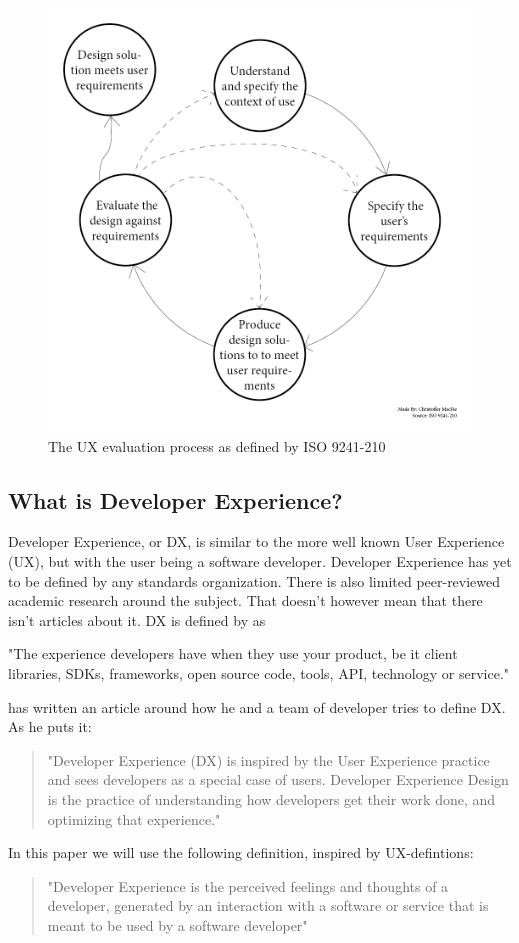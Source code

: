 \documentclass{article}
\begin{document}
\begin{figure}[H]
\centering
\includegraphics[width=\linewidth]{iso9241-210.png}
\caption{The UX evaluation process as defined by ISO 9241-210}
\label{fig:iso9241}
\end{figure}
\subsection{What is Developer Experience?}

Developer Experience, or DX, is similar to the more well known User
Experience (UX), but with the user being a software developer. Developer Experience has yet to be defined by any standards organization. There is also limited peer-reviewed academic research around the subject. That doesn't however mean that there isn't articles about it. DX is
defined by \cite{jarman} as
\begin{displayquote}
"The experience developers have when they use your product, be it
client libraries, SDKs, frameworks, open source code, tools, API,
technology or service."
\end{displayquote}
\cite{dhide} has written an article around how he and a team of developer tries to define DX. As he puts it:
\begin{quote}
"Developer Experience (DX) is inspired by the User Experience practice and sees developers as a special case of users. Developer Experience Design is the practice of understanding how developers get their work done, and optimizing that experience."
\end{quote}
In this paper we will use the following definition, inspired by UX-defintions:
\begin{quote}
"Developer Experience is the perceived feelings and thoughts of a developer, generated by an interaction with a software or service that is meant to be used by a software developer"
\end{quote}
\end{document}

